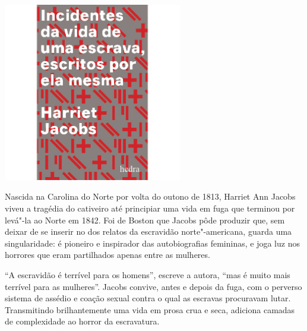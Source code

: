 \pagebreak

\begin{center}
\hspace*{.5cm}\includegraphics[width=78mm]{./grid/jacobs.jpg}
\end{center}

\hspace*{-7cm}\hrulefill\hspace*{-7cm}

\medskip

\noindent{}Nascida na Carolina do Norte por volta do outono de 1813, Harriet Ann Jacobs viveu a tragédia do cativeiro até principiar uma vida em fuga que terminou por levá"-la ao Norte em 1842. Foi de Boston que Jacobs pôde produzir {} que, sem deixar de se inserir no {} dos relatos da escravidão norte"-americana, guarda uma singularidade: é pioneiro e inspirador das autobiografias femininas, e joga luz nos horrores que eram partilhados apenas entre as mulheres.

“A escravidão é terrível para os homens”, escreve a autora, “mas é muito mais terrível para as mulheres”. Jacobs convive, antes e depois da fuga, com o perverso sistema de assédio e coação sexual contra o qual as escravas procuravam lutar. Transmitindo brilhantemente uma vida em prosa crua e seca, {} adiciona camadas de complexidade ao horror da escravatura.


\vfill

\hspace*{-.4cm}\begin{minipage}[c]{.5\linewidth}
\small{
{}}
\end{minipage}


